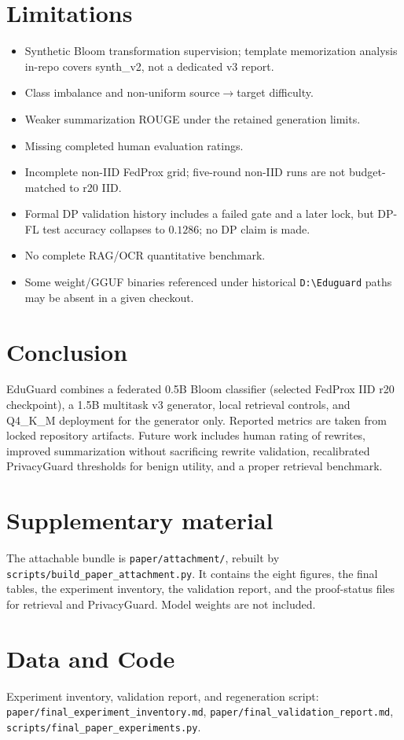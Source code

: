 \documentclass[journal]{IEEEtran}
\begin{document}
\section{Limitations}
\begin{itemize}
  \item Synthetic Bloom transformation supervision; template memorization analysis in-repo covers synth\_v2, not a dedicated v3 report.
  \item Class imbalance and non-uniform source$\rightarrow$target difficulty.
  \item Weaker summarization ROUGE under the retained generation limits.
  \item Missing completed human evaluation ratings.
  \item Incomplete non-IID FedProx grid; five-round non-IID runs are not budget-matched to r20 IID.
  \item Formal DP validation history includes a failed gate and a later lock, but DP-FL test accuracy collapses to $0.1286$; no DP claim is made.
  \item No complete RAG/OCR quantitative benchmark.
  \item Some weight/GGUF binaries referenced under historical \texttt{D:\textbackslash Eduguard} paths may be absent in a given checkout.
\end{itemize}

\section{Conclusion}
EduGuard combines a federated 0.5B Bloom classifier (selected FedProx IID r20 checkpoint), a 1.5B multitask v3 generator, local retrieval controls, and Q4\_K\_M deployment for the generator only.
Reported metrics are taken from locked repository artifacts.
Future work includes human rating of rewrites, improved summarization without sacrificing rewrite validation, recalibrated PrivacyGuard thresholds for benign utility, and a proper retrieval benchmark.

\section*{Supplementary material}
The attachable bundle is \texttt{paper/attachment/}, rebuilt by
\texttt{scripts/build\_paper\_attachment.py}.
It contains the eight figures, the final tables, the experiment inventory,
the validation report, and the proof-status files for retrieval and PrivacyGuard.
Model weights are not included.

\section*{Data and Code}
Experiment inventory, validation report, and regeneration script:
\texttt{paper/final\_experiment\_inventory.md},
\texttt{paper/final\_validation\_report.md},
\texttt{scripts/final\_paper\_experiments.py}.



\end{document}
